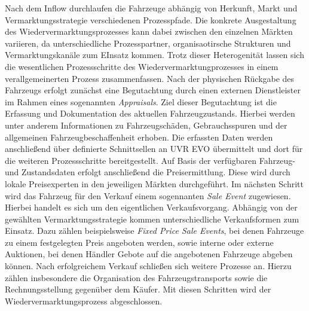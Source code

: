 \documentclass[../main.tex]{subfiles}
\begin{document}
Nach dem Inflow durchlaufen die Fahrzeuge abhängig von Herkunft, Markt und Vermarktungsstrategie verschiedenen Prozesspfade. Die konkrete Ausgestaltung des Wiedervermarktungsprozesses kann dabei zwischen den einzelnen Märkten variieren, da unterschiedliche Prozesspartner, organisaotirsche Strukturen und Vermarktungskanäle zum EInsatz kommen. Trotz dieser Heterogenität lassen sich die wesentlichen Prozessschritte des Wiedervermarktungprozesses in einem verallgemeinerten Prozess zusammenfassen.
Nach der physischen Rückgabe des Fahrzeugs erfolgt zunächst eine Begutachtung durch einen externen Dienstleister im Rahmen eines sogenannten \textit{Appraisals}. Ziel dieser Begutachtung ist die Erfassung und Dokumentation des aktuellen Fahrzeugzustands. Hierbei werden unter anderem Informationen zu Fahrzeugschäden, Gebrauchsspuren und der allgemeinen Fahrzeugbeschaffenheit erhoben. Die erfassten Daten werden anschließend über definierte Schnittsellen an UVR EVO übermittelt und dort für die weiteren Prozessschritte bereitgestellt.
Auf Basis der verfügbaren Fahrzeug- und Zustandsdaten erfolgt anschließend die Preisermittlung. Diese wird durch lokale Preisexperten in den jeweiligen Märkten durchgeführt.
Im nächsten Schritt wird das Fahrzeug für den Verkauf einem sogennanten \textit{Sale Event} zugewiesen. Hierbei handelt es sich um den eigentlichen Verkaufsvorgang. Abhängig von der gewählten Vermarktungsstrategie kommen unterschiedliche Verkaufsformen zum Einsatz. Dazu zählen beispielsweise \textit{Fixed Price Sale Events}, bei denen Fahrzeuge zu einem festgelegten Preis angeboten werden, sowie interne oder externe Auktionen, bei denen Händler Gebote auf die angebotenen Fahrzeuge abgeben können.
Nach erfolgreichem Verkauf schließen sich weitere Prozesse an. Hierzu zählen insbesondere die Organisation des Fahrzeugstransports sowie die Rechnungsstellung gegenüber dem Käufer. Mit diesen Schritten wird der Wiedervermarktungsprozess abgeschlossen.
\end{document}
